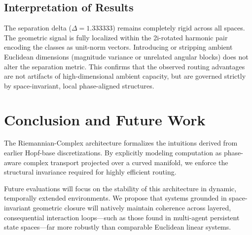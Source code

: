\documentclass[11pt,twoside,a4paper]{article}
\begin{document}
\subsection{Interpretation of Results}
The separation delta ($\Delta = 1.333333$) remains completely rigid across all spaces. The geometric signal is fully localized within the 2i-rotated harmonic pair encoding the classes as unit-norm vectors. Introducing or stripping ambient Euclidean dimensions (magnitude variance or unrelated angular blocks) does not alter the separation metric. This confirms that the observed routing advantages are not artifacts of high-dimensional ambient capacity, but are governed strictly by space-invariant, local phase-aligned structures. 

\section{Conclusion and Future Work}
The Riemannian-Complex architecture formalizes the intuitions derived from earlier Hopf-base discretizations. By explicitly modeling computation as phase-aware complex transport projected over a curved manifold, we enforce the structural invariance required for highly efficient routing. 

Future evaluations will focus on the stability of this architecture in dynamic, temporally extended environments. We propose that systems grounded in space-invariant geometric closure will natively maintain coherence across layered, consequential interaction loops—such as those found in multi-agent persistent state spaces—far more robustly than comparable Euclidean linear systems.


\end{document}
